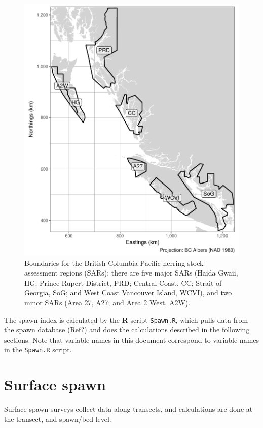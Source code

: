 \documentclass[12pt]{article}
\begin{document}
\begin{figure}
\centering
\includegraphics[width=\linewidth]{Figures/BC.pdf}
\caption{Boundaries for the British Columbia Pacific herring stock assessment regions (SARs): there are five major SARs (Haida Gwaii, HG; Prince Rupert District, PRD; Central Coast, CC; Strait of Georgia, SoG; and West Coast Vancouver Island, WCVI), and two minor SARs (Area 27, A27; and Area 2 West, A2W).}
\label{figBC}
\end{figure}

The spawn index is calculated by the \textbf{R} \citeyearpar[RCT][]{R-3.3.2} script \texttt{Spawn.R}, which pulls data from the spawn database (Ref?) and does the calculations described in the following sections.
Note that variable names in this document correspond to variable names in the \texttt{Spawn.R} script.

\section{Surface spawn}

Surface spawn surveys collect data along transects, and calculations are done at the transect, and spawn/bed level.
\end{document}
